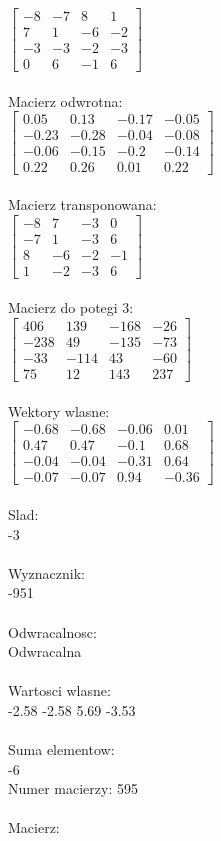 \documentclass[a4paper,12pt]{article}
\begin{document}
$\begin{bmatrix} -8&-7&8&1\\7&1&-6&-2\\-3&-3&-2&-3\\0&6&-1&6 \end{bmatrix}$
\\
\\
Macierz odwrotna:\\

$\begin{bmatrix} 0.05&0.13&-0.17&-0.05\\-0.23&-0.28&-0.04&-0.08\\-0.06&-0.15&-0.2&-0.14\\0.22&0.26&0.01&0.22 \end{bmatrix}$
\\
\\
Macierz transponowana:\\

$\begin{bmatrix} -8&7&-3&0\\-7&1&-3&6\\8&-6&-2&-1\\1&-2&-3&6 \end{bmatrix}$
\\
\\
Macierz do potegi 3:\\

$\begin{bmatrix} 406&139&-168&-26\\-238&49&-135&-73\\-33&-114&43&-60\\75&12&143&237 \end{bmatrix}$
\\
\\
Wektory wlasne:\\

$\begin{bmatrix} -0.68&-0.68&-0.06&0.01\\0.47&0.47&-0.1&0.68\\-0.04&-0.04&-0.31&0.64\\-0.07&-0.07&0.94&-0.36 \end{bmatrix}$
\\
\\
Slad:\\
-3
\\
\\
Wyznacznik:\\
-951
\\
\\
Odwracalnosc:\\
Odwracalna
\\
\\
Wartosci wlasne:\\
-2.58 -2.58 5.69 -3.53
\\
\\
Suma elementow:\\
-6
\\
\newpage
Numer macierzy:
595
\\
\\
Macierz:\\
\end{document}
